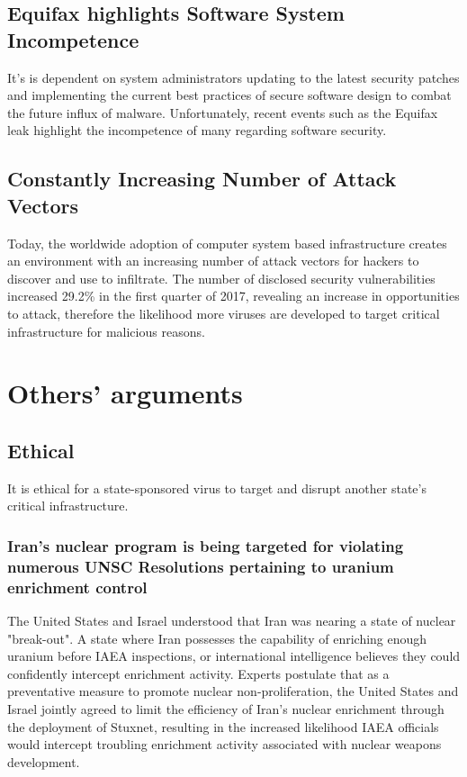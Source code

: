 \documentclass[12pt]{article}
\begin{document}
\begin{multicols}{2}
\subsection{Equifax highlights Software System Incompetence}

It's is dependent on system administrators updating to the latest security patches and implementing the current best practices of secure software design to combat the future influx of malware. Unfortunately, recent events such as the Equifax leak highlight the incompetence of many regarding software security.\cite{equifaxHack}

\subsection{Constantly Increasing Number of Attack Vectors}

Today, the worldwide adoption of computer system based infrastructure creates an environment with an increasing number of attack vectors for hackers to discover and use to infiltrate. The number of disclosed security vulnerabilities increased 29.2\% in the first quarter of 2017, revealing an increase in opportunities to attack, therefore the likelihood more viruses are developed to target critical infrastructure for malicious reasons.\cite{industrialCyberVulnerabilities}

\section{Others' arguments}

\subsection{Ethical}

It is ethical for a state-sponsored virus to target and disrupt another state's critical infrastructure.

\subsubsection{Iran's nuclear program is being targeted for violating numerous UNSC Resolutions pertaining to uranium enrichment control}

The United States and Israel understood that Iran was nearing a state of nuclear "break-out". A state where Iran possesses the capability of enriching enough uranium before IAEA inspections, or international intelligence believes they could confidently intercept enrichment activity. Experts postulate that as a preventative measure to promote nuclear non-proliferation, the United States and Israel jointly agreed to limit the efficiency of Iran's nuclear enrichment through the deployment of Stuxnet, resulting in the increased likelihood IAEA officials would intercept troubling enrichment activity associated with nuclear weapons development.\cite{theRealStoryOfStuxnet}


\end{multicols}
\end{document}
